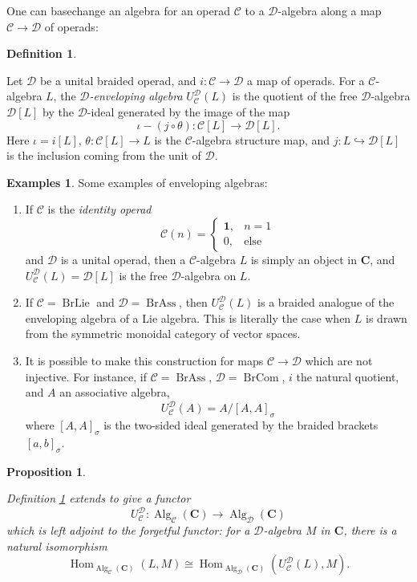 \documentclass[12pt]{article}
\DeclareMathOperator{\Alg}{Alg}
\DeclareMathOperator{\Hom}{Hom}
\DeclareMathOperator{\BrAss}{BrAss}
\DeclareMathOperator{\BrLie}{BrLie}
\DeclareMathOperator{\BrCom}{BrCom}
\newcommand{\CC} {\mathcal{C}}
\newcommand{\DD} {\mathcal{D}}
\newcommand{\bC} {\mathbf{C}}
\newcommand{\one} {\mathbf{1}}
\theoremstyle{plain}
\newtheorem{prop}[thm]{Proposition}
\theoremstyle{definition}
\newtheorem{defn}[thm]{Definition}
\newtheorem{exmps}[thm]{Examples}
\theoremstyle{remark}
\begin{document}
One can basechange an algebra for an operad $\CC$ to a $\DD$-algebra along a map $\CC \to \DD$ of operads:

\begin{defn} \label{gen_enveloping_defn} 

Let $\DD$ be a unital braided operad, and $i:\CC \to \DD$ a map of operads.  For a $\CC$-algebra $L$, the \emph{$\DD$-enveloping algebra} $U_{\CC}^{\DD}(L)$ is the quotient of the free $\DD$-algebra $\DD[L]$ by the $\DD$-ideal generated by the image of the map
%
$$\iota - (j \circ \theta): \CC[L] \to \DD[L].$$
%
Here $\iota = i[L]$, $\theta: \CC[L] \to L$ is the $\CC$-algebra structure map, and $j: L \hookrightarrow \DD[L]$ is the inclusion coming from the unit of $\DD$.

\end{defn}

\begin{exmps} Some examples of enveloping algebras:

\begin{enumerate}

\item If $\CC$ is the \emph{identity operad}
%
$$\CC(n) = \left\{\begin{array}{ll} \one, & n=1 \\ 0, & \mbox{else} \end{array} \right.$$
%
and $\DD$ is a unital operad, then a $\CC$-algebra $L$ is simply an object in $\bC$, and $U_{\CC}^{\DD}(L) = \DD[L]$ is the free $\DD$-algebra on $L$.

\item If $\CC = \BrLie$ and $\DD = \BrAss$, then $U_{\CC}^{\DD}(L)$ is a braided analogue of the enveloping algebra of a Lie algebra.  This is literally the case when $L$ is drawn from the symmetric monoidal category of vector spaces.

\item It is possible to make this construction for maps $\CC \to \DD$ which are not injective.  For instance, if $\CC = \BrAss$, $\DD = \BrCom$, $i$ the natural quotient, and $A$ an associative algebra, 
%
$$U_{\CC}^{\DD}(A) = A / [A, A]_{\sigma}$$
%
where $[A, A]_{\sigma}$ is the two-sided ideal generated by the braided brackets $[a, b]_{\sigma}$.

\end{enumerate}

\end{exmps}

\begin{prop} \label{univ_prop}


Definition \ref{gen_enveloping_defn} extends to give a functor
%
$$U_{\CC}^{\DD}: \Alg_{\CC}(\bC) \to \Alg_{\DD}(\bC)$$
%
which is left adjoint to the forgetful functor: for a $\DD$-algebra $M$ in $\bC$, there is a natural isomorphism
%
$$\Hom_{\Alg_{\CC}(\bC)}(L, M) \cong \Hom_{\Alg_{\DD}(\bC)}(U_{\CC}^{\DD}(L), M).$$

\end{prop}
\end{document}
